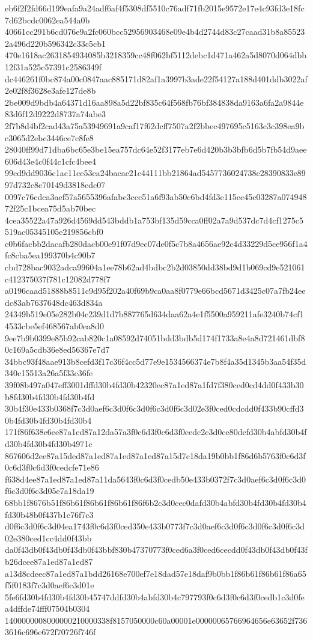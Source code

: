 {eb6f2f2fd66d199eafa9a24adf6af4f5308df5510c76adf71fb2015e9572e17e4c93fd3e18fc7d62bcdc0062ea544a0b
40661cc291b6cd076e9a2fc060bcc52956903468e09e4b4d2744d83c27caad31b8a855232a496d220b596342c33c5cb1
470e1618ac2631854934085b3218359cc48f062bf5112debc1d471a462a5d8070d064dbb12f31a525c57391c2586349f
dc446261f0bc874a00c0847aac885171d82af1a3997b3ade22f54127a188d401ddb3022af2e02f8f3628e3afe127de8b
2be009d9bdb4a64371d16aa898a5d22bf835c64f568fb76bf384838da9163a6fa2a9844e83d6f12d9222d8737a74abe3
2f7b8d4bf2cad43a75a53949691a9caf17f62dcff7507a2f2bbec497695c5163c3c398ea9bc3065d2ebc3446ce7c8fe8
28040ff99d71dba6bc65e3be15ea757dc64e52f3177eb7e6d420b3b3bfb6d5b7fb54d9aee606d43e4c0f44c1cfc4bee4
99cd9dd9036c1ac11ce53ea24bacae21c44111bb21864ad5457736024738c28390833e8997d732c8e70149d3818edc07
0097c76cdca3aef57a5655396afabc3ccc51a6f93ab50c6bd4fd3e115ec45c03287a07494872f25c1bcea75d5ab70bec
4cea35522a47a926d4569dd543bddb1a753bf135d59cca0ff02a7a9d537dc7d4cf1275c5519ac05345105e219856cbf0
c0b6facbb2dacafb280dacb00e91f07d9ec07de0f5c7b8a4656ae92c4d33229d5ce956f1a4fc8cba5ea199370b4c90b7
cbd728bac9032adca99604a1ee78b62ad4bdbc2b2d03850dd38bd9d1b069cd9e521061c412375037f781c12082d778f7
a0196caad51888b8511c9d95f202a40f69b9ca0aa8f0779e66bcd5671d3425c07a7fb24eedc83ab7637648dc463d834a
24349b519e05e282b04c239d1d7b887765d634daa62a4e1f5500a959211afe3240b74cf14533cbe5ef468567ab0ea8d0
9ee7b9b0399e85b92cab820c1a08592d74051bdd3bdb5d174f1733a8e4a8d721461dbf80c169a5cdb36e8ed56367e7d7
34bbc93f48aae913b8cefd3f17c36f4cc5d77e9e1534566374e7b8f4a35d1345b3aa54f35d340c15513a26a5f33c36fe
39f08b497a047eff3001dffd30b4fd30b42320ec87a1ed87a1fd7f380ced0cd4dd0f433b30b8fd30b4fd30b4fd30b4fd
30b4f30e433b0368f7c3d0aef6c3d0f6c3d0f6c3d0f6c3d02e3f0ced0cdcdd0f433b90cffd30b4fd30b4fd30b4fd30b4
171f86f638e6ee87a1ed87a12da57a3f0c6d3f0c6d3f0cedc2c3d0ce80dcfd30b4abfd30b4fd30b4fd30b4fd30b4971c
867606d2ee87a15ded87a1ed87a1ed87a1ed87a15d7c18da19b0bb1f86d6b5763f0c6d3f0c6d3f0c6d3f0cedcfe71e86
f638d4ee87a1ed87a1ed87a11da5643f0c6d3f0cedb50e433b0372f7c3d0aef6c3d0f6c3d0f6c3d0f6c3d05e7a18da19
68bb1f8676b51f86b61f86b61f86b61f86f6b2c3d0cec0dafd30b4abfd30b4fd30b4fd30b4fd30b48b0f437b1c76f7c3
d0f6c3d0f6c3d04ea1743f0c6d3f0ced350e433b0773f7c3d0aef6c3d0f6c3d0f6c3d0f6c3d02e380ced1cc4dd0f43bb
da0f43db0f43db0f43db0f43bbf830b47370773f0ced6a3f0ced6cecdd0f43db0f43db0f43fb26dcee87a1ed87a1ed87
a13d8cdeec87a1ed87a1bdd26168e700ef7e18dad57e18daf9b0bb1f86b61f86b61f86a65f5f0183f7c3d0aef6c3d01e
5fe6fd30b4fd30b4fd30b45747ddfd30b4abfd30b4c797793f0c6d3f0c6d3f0cedb1c3d0fea4dffde74fff07504b0304
1400000008000000210000338f8157050000c60a00001e00000065766964656e63652f7363616c696e672f70726f746f
}
